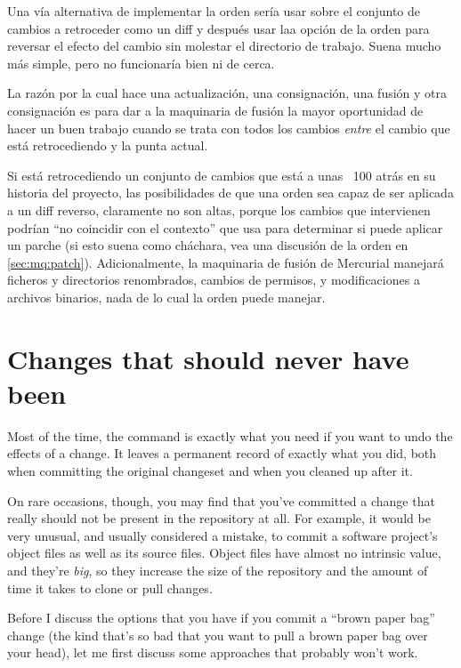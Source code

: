 Una vía alternativa de implementar la orden  sería usar
 sobre el conjunto de cambios a retroceder como un diff
y después usar laa opción  de la orden
 para reversar el efecto del cambio sin molestar el
directorio de trabajo.  Suena mucho más simple, pero no funcionaría
bien ni de cerca.

La razón por la cual  hace una actualización, una
consignación, una fusión y otra consignación es para dar a la
maquinaria de fusión la mayor oportunidad de hacer un buen trabajo
cuando se trata con todos los cambios \emph{entre} el cambio que está
retrocediendo y la punta actual.

Si está retrocediendo un conjunto de cambios que está a unas ~100
atrás en su historia del proyecto, las posibilidades de que una orden
 sea capaz de ser aplicada a un diff reverso,
claramente no son altas, porque los cambios que intervienen podrían
``no coincidir con el contexto'' que  usa  para
determinar si puede aplicar un parche (si esto suena como cháchara,
vea una discusión de la orden  en \ref{sec:mq:patch}).
Adicionalmente, la maquinaria de fusión de Mercurial manejará ficheros
y directorios renombrados, cambios de permisos, y modificaciones a
archivos binarios, nada de lo cual la orden  puede manejar.

\section{Changes that should never have been}
\label{sec:undo:aaaiiieee}

Most of the time, the  command is exactly what you need
if you want to undo the effects of a change.  It leaves a permanent
record of exactly what you did, both when committing the original
changeset and when you cleaned up after it.

On rare occasions, though, you may find that you've committed a change
that really should not be present in the repository at all.  For
example, it would be very unusual, and usually considered a mistake,
to commit a software project's object files as well as its source
files.  Object files have almost no intrinsic value, and they're
\emph{big}, so they increase the size of the repository and the amount
of time it takes to clone or pull changes.

Before I discuss the options that you have if you commit a ``brown
paper bag'' change (the kind that's so bad that you want to pull a
brown paper bag over your head), let me first discuss some approaches
that probably won't work.

